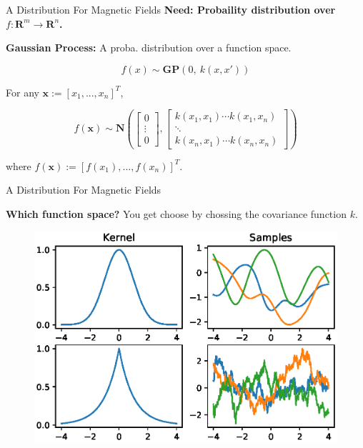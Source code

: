 \documentclass{beamer}
\begin{document}
\begin{frame}{A Distribution For Magnetic Fields}
  \textbf{Need: Probaility distribution over $f: \mathbf{R}^m \rightarrow \mathbf{R}^n$.}

  \textbf{Gaussian Process:} A proba. distribution over a function space.

  \begin{equation*}
    f(x) \sim \mathbf{GP}\left( 0,\ k(x, x')\right)
  \end{equation*}

  For any $\mathbf{x} := [x_1, ... , x_n]^T$,

  \begin{equation*}
    f(\mathbf{x}) \sim
    \mathbf{N}
    \left(
    \begin{bmatrix} 0 \\ \vdots \\ 0 \end{bmatrix},
    \begin{bmatrix}
      k(x_1, x_1) \cdots  k(x_1, x_n)\\
      \ddots \\
      k(x_n, x_1) \cdots  k(x_n, x_n)
    \end{bmatrix}
    \right)
  \end{equation*}

  where $f(\mathbf{x}) := [f(x_1), ... , f(x_n)]^T$.

\end{frame}

\begin{frame}{A Distribution For Magnetic Fields}

  \textbf{Which function space?} You get choose by chossing the covariance function $k$.

  \begin{figure}
    \includegraphics[width=\linewidth]{plots/regularity.eps}
  \end{figure}

\end{frame}
\end{document}
